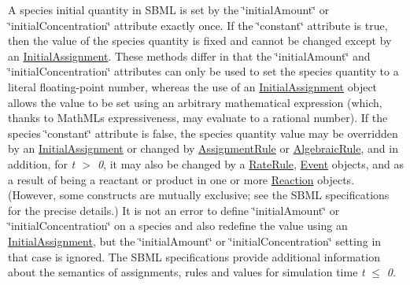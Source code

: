 A species\textquotesingle{} initial quantity in S\+B\+ML is set by the \char`\"{}initial\+Amount\char`\"{} or \char`\"{}initial\+Concentration\char`\"{} attribute exactly once. If the \char`\"{}constant\char`\"{} attribute is {\ttfamily true}, then the value of the species\textquotesingle{} quantity is fixed and cannot be changed except by an \hyperlink{class_initial_assignment}{Initial\+Assignment}. These methods differ in that the \char`\"{}initial\+Amount\char`\"{} and \char`\"{}initial\+Concentration\char`\"{} attributes can only be used to set the species quantity to a literal floating-\/point number, whereas the use of an \hyperlink{class_initial_assignment}{Initial\+Assignment} object allows the value to be set using an arbitrary mathematical expression (which, thanks to Math\+ML\textquotesingle{}s expressiveness, may evaluate to a rational number). If the species\textquotesingle{} \char`\"{}constant\char`\"{} attribute is {\ttfamily false}, the species\textquotesingle{} quantity value may be overridden by an \hyperlink{class_initial_assignment}{Initial\+Assignment} or changed by \hyperlink{class_assignment_rule}{Assignment\+Rule} or \hyperlink{class_algebraic_rule}{Algebraic\+Rule}, and in addition, for {\itshape t $>$ 0}, it may also be changed by a \hyperlink{class_rate_rule}{Rate\+Rule}, \hyperlink{class_event}{Event} objects, and as a result of being a reactant or product in one or more \hyperlink{class_reaction}{Reaction} objects. (However, some constructs are mutually exclusive; see the S\+B\+ML specifications for the precise details.) It is not an error to define \char`\"{}initial\+Amount\char`\"{} or \char`\"{}initial\+Concentration\char`\"{} on a species and also redefine the value using an \hyperlink{class_initial_assignment}{Initial\+Assignment}, but the \char`\"{}initial\+Amount\char`\"{} or \char`\"{}initial\+Concentration\char`\"{} setting in that case is ignored. The S\+B\+ML specifications provide additional information about the semantics of assignments, rules and values for simulation time {\itshape t} $\leq$ {\itshape 0}.

